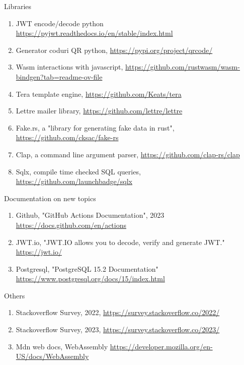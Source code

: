 \noindent Libraries
\begin{enumerate}[noitemsep, leftmargin=0.3cm]
    \item \label{lib-jwt} JWT encode/decode python \href{https://pyjwt.readthedocs.io/en/stable/index.html}{https://pyjwt.readthedocs.io/en/stable/index.html}
    \item \label{lib-qr} Generator coduri QR python, \href{https://pypi.org/project/qrcode/}{https://pypi.org/project/qrcode/}
    \item \label{lib-wasm-bindgen} Wasm interactions with javascript, \href{https://github.com/rustwasm/wasm-bindgen?tab=readme-ov-file}{https://github.com/rustwasm/wasm-bindgen?tab=readme-ov-file}
    \item \label{lib-tera} Tera template engine, \href{https://github.com/Keats/tera}{https://github.com/Keats/tera}
    \item \label{lib-lettre} Lettre mailer library, \href{https://github.com/lettre/lettre}{https://github.com/lettre/lettre}
    \item \label{lib-fakers} Fake.rs, a "library for generating fake data in rust", \href{https://github.com/cksac/fake-rs}{https://github.com/cksac/fake-rs}
    \item \label{lib-claprs} Clap, a command line argument parser, \href{https://github.com/clap-rs/clap}{https://github.com/clap-rs/clap}
    \item \label{lib-sqlxrs} Sqlx, compile time checked SQL queries, \href{https://github.com/launchbadge/sqlx}{https://github.com/launchbadge/sqlx}
\end{enumerate}

\noindent Documentation on new topics
\begin{enumerate}[itemsep=0.1ex,parsep=0.1ex,leftmargin=0.3cm]
    \item \label{github-actions} Github, "GitHub Actions Documentation", 2023 \href{https://docs.github.com/en/actions}{https://docs.github.com/en/actions}
    \item \label{jwt} JWT.io, "JWT.IO allows you to decode, verify and generate JWT." \href{https://jwt.io/}{https://jwt.io/} 
    \item \label{postgres} Postgresql, "PostgreSQL 15.2 Documentation" \href{https://www.postgresql.org/docs/15/index.html}{https://www.postgresql.org/docs/15/index.html}
\end{enumerate}

\noindent Others
\begin{enumerate}[noitemsep, leftmargin=0.3cm]
    \item \label{stackoverflow-studiu-2022} Stackoverflow Survey, 2022, \href{https://survey.stackoverflow.co/2022/}{https://survey.stackoverflow.co/2022/}
    \item \label{stackoverflow-studiu-2023} Stackoverflow Survey, 2023, \href{https://survey.stackoverflow.co/2023/}{https://survey.stackoverflow.co/2023/}
    \item \label{wasm} Mdn web docs, WebAssembly \href{https://developer.mozilla.org/en-US/docs/WebAssembly}{https://developer.mozilla.org/en-US/docs/WebAssembly}
\end{enumerate}
